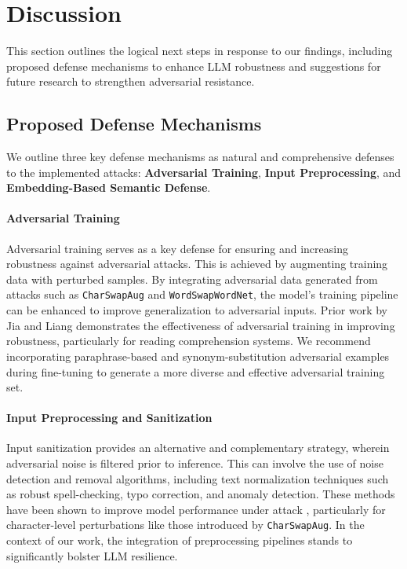 \documentclass[conference]{IEEEtran}
\begin{document}
\section{Discussion}

This section outlines the logical next steps in response to our findings, including proposed defense mechanisms to enhance LLM robustness and suggestions for future research to strengthen adversarial resistance.

\subsection{Proposed Defense Mechanisms}

We outline three key defense mechanisms as natural and comprehensive defenses to the implemented attacks: \textbf{Adversarial Training}, \textbf{Input Preprocessing}, and \textbf{Embedding-Based Semantic Defense}.

\paragraph{Adversarial Training}
Adversarial training serves as a key defense for ensuring and increasing robustness against adversarial attacks. This is achieved by augmenting training data with perturbed samples. By integrating adversarial data generated from attacks such as \texttt{CharSwapAug} and \texttt{WordSwapWordNet}, the model’s training pipeline can be enhanced to improve generalization to adversarial inputs. Prior work by Jia and Liang \cite{jia2017adversarial} demonstrates the effectiveness of adversarial training in improving robustness, particularly for reading comprehension systems. We recommend incorporating paraphrase-based and synonym-substitution adversarial examples during fine-tuning to generate a more diverse and effective adversarial training set.

\paragraph{Input Preprocessing and Sanitization}
Input sanitization provides an alternative and complementary strategy, wherein adversarial noise is filtered prior to inference. This can involve the use of noise detection and removal algorithms, including text normalization techniques such as robust spell-checking, typo correction, and anomaly detection. These methods have been shown to improve model performance under attack \cite{omar2022robust}, particularly for character-level perturbations like those introduced by \texttt{CharSwapAug}. In the context of our work, the integration of preprocessing pipelines stands to significantly bolster LLM resilience.
\end{document}
